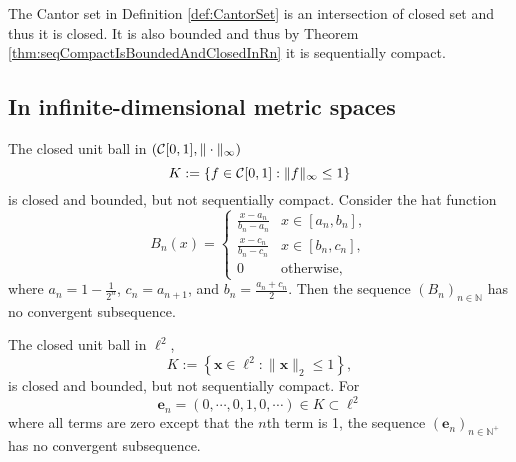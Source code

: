 \begin{exm}
  The Cantor set in Definition \ref{def:CantorSet}
  is an intersection of closed set
  and thus it is closed.
  It is also bounded and thus
  by Theorem \ref{thm:seqCompactIsBoundedAndClosedInRn}
  it is sequentially compact.
\end{exm}


\subsection{In infinite-dimensional metric spaces}


\begin{exm}
  \label{exm:closedBallInC01}
  The closed unit ball in $({\cal C}[0,1], \|\cdot\|_{\infty})$
  \begin{equation}
    \label{eq:closedBallInC01}
    K:= \left\{f\in {\cal C}[0,1] :
      \|f\|_{\infty} \le 1 \right\}
  \end{equation}
  is closed and bounded,
  but not sequentially compact.
  Consider the hat function
  \begin{equation}
    \label{eq:hatFuncInt}
    B_n(x) = 
    \begin{cases}
      \frac{x-a_n}{b_n-a_n} & x\in [a_n, b_n],
      \\
      \frac{x-c_n}{b_n-c_n} & x\in [b_n, c_n],
      \\
      0 & \text{otherwise},
    \end{cases}
  \end{equation}
  where $a_n=1-\frac{1}{2^n}$, $c_n=a_{n+1}$,
  and $b_n=\frac{a_n+c_n}{2}$.
  Then the sequence $(B_n)_{n\in \mathbb{N}}$
  has no convergent subsequence.
\end{exm}

\begin{exm}
  \label{exm:closedBallInEll2}
  The closed unit ball in $\ell^2$, 
  \begin{equation}
    \label{eq:closedBallInEll2}
    K:= \left\{\mathbf{x}\in \ell^2 :
      \|\mathbf{x}\|_2 \le 1 \right\}, 
  \end{equation}
  is closed and bounded, but not sequentially compact.
  For
  \begin{displaymath}
    \mathbf{e}_n = (0,\cdots,0,1,0,\cdots)\in K \subset \ell^2
  \end{displaymath}
  where all terms are zero except that the $n$th term is 1, 
  the sequence $(\mathbf{e}_n)_{n\in \mathbb{N}^+}$
  has no convergent subsequence.
\end{exm}

